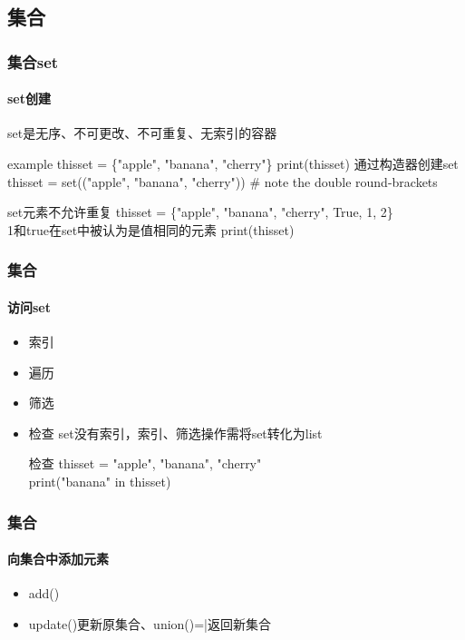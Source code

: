 \documentclass{beamer}
\begin{document}
\subsection{集合}

\begin{frame}[t]
	\frametitle{集合set}
	\framesubtitle{set创建}
	set是无序、不可更改、不可重复、无索引的容器
	\begin{block}{example}
		thisset = \{"apple", "banana", "cherry"\}
		print(thisset)
		通过构造器创建set thisset = set(("apple", "banana", "cherry")) # note the double round-brackets
	\end{block}
	\begin{alertblock}{set元素不允许重复}
		thisset = \{"apple", "banana", "cherry", True, 1, 2\}\\1和true在set中被认为是值相同的元素
		print(thisset)
	\end{alertblock}
\end{frame}
\begin{frame}[t]
	\frametitle{集合}
	\framesubtitle{访问set}
	\begin{itemize}
		\item 索引
		\item 遍历
		\item 筛选
		\item 检查
		      set没有索引，索引、筛选操作需将set转化为list
		      \begin{block}{检查}
			      thisset = {"apple", "banana", "cherry"}\\
			      print("banana" in thisset)
		      \end{block}

	\end{itemize}
\end{frame}

\begin{frame}[t]
	\frametitle{集合}
	\framesubtitle{向集合中添加元素}
	\begin{itemize}
		\item add()
		\item update()更新原集合、union()=|返回新集合
	\end{itemize}
\end{frame}
\end{document}
